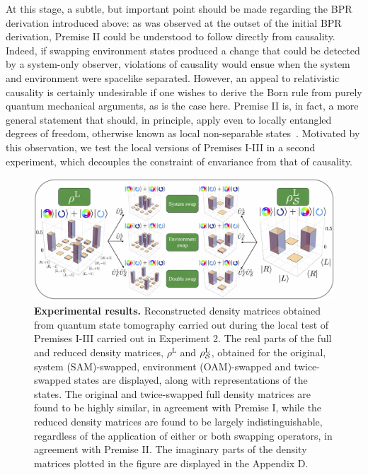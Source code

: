 \documentclass[12pt]{iopart}
\begin{document}
At this stage, a subtle, but important point should be made regarding the BPR derivation introduced above: as was observed at the outset of the initial BPR derivation, Premise II could be understood to follow directly from causality. Indeed, if swapping environment states produced a change that could be detected by a system-only observer, violations of causality would ensue when the system and environment were spacelike separated. However, an appeal to relativistic causality is certainly undesirable if one wishes to derive the Born rule from purely quantum mechanical arguments, as is the case here. Premise II is, in fact, a more general statement that should, in principle, apply even to locally entangled degrees of freedom, otherwise known as local non-separable states~\cite{footnote:03}. Motivated by this observation, we test the local versions of Premises I-III in a second experiment, which decouples the constraint of envariance from that of causality.
%
\begin{figure}[t]
	\centering
	\includegraphics[width=\columnwidth]{fig4.jpg}
	\caption{{\bf Experimental results.} Reconstructed density matrices obtained from quantum state tomography carried out during the local test of Premises I-III carried out in Experiment 2. The real parts of the full and reduced density matrices, $\rho^\mathrm{L}$ and $\rho^\mathrm{L}_{\cal S}$, obtained for the original, system (SAM)-swapped, environment (OAM)-swapped and twice-swapped states are displayed, along with  representations of the states. The original and twice-swapped full density matrices are found to be highly similar, in agreement with Premise I, while the reduced density matrices are found to be largely indistinguishable, regardless of the application of either or both swapping operators, in agreement with Premise II. The imaginary parts of the density matrices plotted in the figure are displayed in the Appendix D.}%
	\label{fig:fig4}
\end{figure}
%
\end{document}
